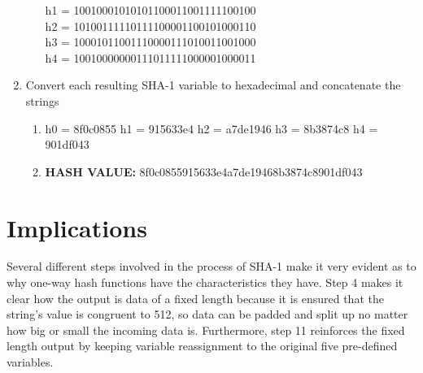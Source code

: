 \documentclass[12pt]{extarticle}
\begin{document}
\begin{enumerate}
\begin{enumerate}
                h1 = 10010001010101100011001111100100\\
                h2 = 10100111110111100001100101000110\\
                h3 = 10001011001110000111010011001000\\
                h4 = 10010000000111011111000001000011\\
    \end{enumerate}
  \item Convert each resulting SHA-1 variable to hexadecimal and concatenate the strings
      \begin{enumerate}
        \item   h0 = 8f0c0855
                h1 = 915633e4
                h2 = a7de1946
                h3 = 8b3874c8
                h4 = 901df043
        \item {\textbf{HASH VALUE:}} 8f0c0855915633e4a7de19468b3874c8901df043
    \end{enumerate}
\end{enumerate}

\section{Implications}
Several different steps involved in the process of SHA-1 make it very evident as to why one-way hash functions have the characteristics they have. Step 4 makes it clear how the output is data of a fixed length because it is ensured that the string's value is congruent to 512, so data can be padded and split up no matter how big or small the incoming data is. Furthermore, step 11 reinforces the fixed length output by keeping variable reassignment to the original five pre-defined variables\cite{src5}.
\end{document}
